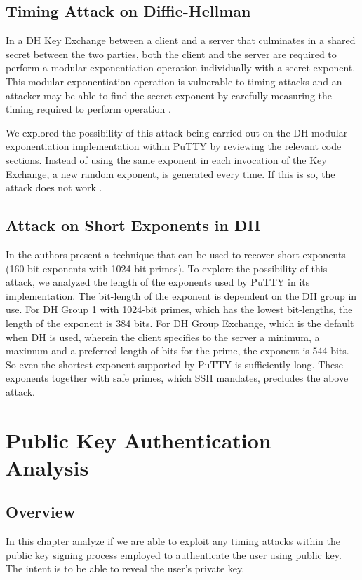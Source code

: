 \documentclass{report}
\begin{document}
\section{Timing Attack on Diffie-Hellman}
In a DH Key Exchange between a client and a server that culminates in a shared secret between the two parties, both the client and the server are required to perform a modular exponentiation operation individually with a secret exponent. This modular exponentiation operation is vulnerable to timing attacks and an attacker may be able to find the secret exponent by carefully measuring the timing required to perform operation \cite{kocher96}.\par
We explored the possibility of this attack being carried out on the DH modular exponentiation implementation within PuTTY by reviewing the relevant code sections. Instead of using the same exponent in each invocation of the Key Exchange, a new random exponent, is generated every time. If this is so, the attack does not work \cite{kocher96}.
\section{Attack on Short Exponents in DH}
In \cite{oorschot96} the authors present a technique that can be used to recover short exponents (160-bit exponents with 1024-bit primes). To explore the possibility of this attack, we analyzed the length of the exponents used by PuTTY in its implementation. The bit-length of the exponent is dependent on the DH group in use. For DH Group 1 with 1024-bit primes, which has the lowest bit-lengths, the length of the exponent is 384 bits. For DH Group Exchange, which is the default when DH is used, wherein the client specifies to the server a minimum, a maximum and a preferred length of bits for the prime, the exponent is 544 bits. So even the shortest exponent supported by PuTTY is sufficiently long. These exponents together with safe primes, which SSH mandates, precludes the above attack.
\chapter{Public Key Authentication Analysis}
\section{Overview}
In this chapter analyze if we are able to exploit any timing attacks within the public key signing process employed to authenticate the user using public key. The intent is to be able to reveal the user's private key.
\end{document}
